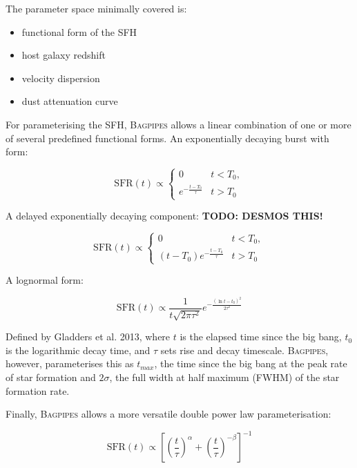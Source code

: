 \documentclass[a4paper,11pt]{article}
\begin{document}
The parameter space minimally covered is:

\begin{itemize}
  \item functional form of the SFH
  \item host galaxy redshift
  \item velocity dispersion
  \item dust attenuation curve
\end{itemize}

\noindent For parameterising the SFH, \textsc{Bagpipes} allows a linear combination of one or more of several predefined functional forms. An exponentially decaying burst with form:

\begin{equation}
  \mathrm{SFR}(t) \propto
  \begin{cases}
    0 & t < T_0, \\
    e^{-\frac{t-T_0}{\tau}} & t > T_0
  \end{cases}
\end{equation}

\noindent A delayed exponentially decaying component: \textbf{TODO: DESMOS THIS!}

\begin{equation}
  \mathrm{SFR}(t) \propto
  \begin{cases}
    0 & t < T_0, \\
    (t-T_0)e^{-\frac{t-T_0}{\tau}} & t > T_0
  \end{cases}
\end{equation}

\noindent A lognormal form:

\begin{equation}
  \mathrm{SFR}(t) \propto
  \frac{1}{t\sqrt{2\pi\tau^2}}
  e^{-\frac{\left(\ln{t-t_0}\right)^2}{2\tau^2}}
\end{equation}

\noindent Defined by Gladders et al. 2013, where $t$ is the elapsed time since the big bang, $t_0$ is the logarithmic decay time, and $\tau$ sets rise and decay timescale.\cite{Gladders_2013} \textsc{Bagpipes}, however, parameterises this as $t_{max}$, the time since the big bang at the peak rate of star formation and $2\sigma$, the full width at half maximum (FWHM) of the star formation rate.\cite{Carnall_2018}

Finally, \textsc{Bagpipes} allows a more versatile double power law parameterisation:

\begin{equation}
  \mathrm{SFR}(t)\propto
  \left[
  \left(\frac{t}{\tau}\right)^{\alpha} +
  \left(\frac{t}{\tau}\right)^{-\beta}
  \right]
  ^{-1}
\end{equation}
\end{document}
